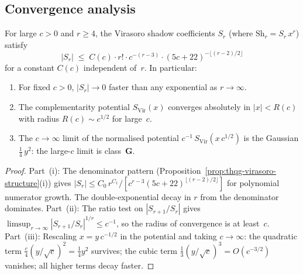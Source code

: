 
\subsection{Convergence analysis}

\begin{proposition}
\ClaimStatusProvedHere
{}
For large $c > 0$ and $r \geq 4$, the Virasoro shadow
coefficients $S_r$ (where $\mathrm{Sh}_r = S_r\,x^r$)
satisfy
\begin{equation}%
|S_r|
\;\leq\;
C(c)\cdot r!\cdot c^{-(r-3)}\cdot(5c+22)^{-\lfloor(r-2)/2\rfloor}
\end{equation}
for a constant $C(c)$ independent of~$r$. In particular:
\begin{enumerate}[label=\textup{(\roman*)}]
\item For fixed $c > 0$, $|S_r| \to 0$ faster than any
 exponential as $r \to \infty$.
\item The complementarity potential
 $S_{\mathrm{Vir}}(x)$ converges absolutely in
 $|x| < R(c)$ with radius
 $R(c) \sim c^{1/2}$ for large~$c$.
\item The $c \to \infty$ limit of the normalised potential
 $c^{-1}\,S_{\mathrm{Vir}}(x\,c^{1/2})$ is the Gaussian
 $\frac{1}{4}\,y^2$: the large-$c$ limit is class~$\mathbf{G}$.
\end{enumerate}
\end{proposition}

\begin{proof}
Part~(i): The denominator pattern
(Proposition~\ref{prop:thqg-virasoro-structure}(i)) gives
$|S_r| \leq C_0\,r^{C_1}/[c^{r-3}(5c+22)^{\lfloor(r-2)/2\rfloor}]$
for polynomial numerator growth. The double-exponential
decay in $r$ from the denominator dominates.
Part~(ii): The ratio test on $|S_{r+1}/S_r|$ gives
$\limsup_{r\to\infty} |S_{r+1}/S_r|^{1/r} \leq c^{-1}$,
so the radius of convergence is at least~$c$.
Part~(iii): Rescaling $x = y\,c^{-1/2}$ in the potential
and taking $c \to \infty$: the quadratic term
$\frac{c}{4}(y/\sqrt{c})^2 = \frac{1}{4}y^2$ survives;
the cubic term $\frac{1}{3}(y/\sqrt{c})^3 = O(c^{-3/2})$
vanishes; all higher terms decay faster.
\end{proof}

